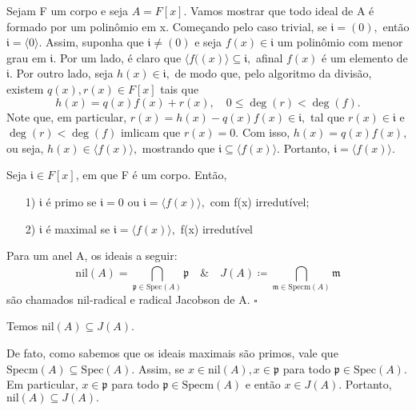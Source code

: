 \documentclass[AlgebraII/algebraII_notes.tex]{subfiles}
\begin{document}
\begin{example}
	Sejam F um corpo e seja \(A = F[x]\). Vamos mostrar que todo ideal de A é formado por um polinômio em x.
	Começando pelo caso trivial, se \(\mathfrak{i} = (0),\) então \(\mathfrak{i} = \langle 0 \rangle.\) Assim, suponha que \(\mathfrak{i}\neq (0)\)
	e seja \(f(x)\in \mathfrak{i}\) um polinômio com menor grau em \(\mathfrak{i}.\) Por um lado, é claro que \(\langle f((x) \rangle\subseteq \mathfrak{i},\)
	afinal \(f(x)\) é um elemento de \(\mathfrak{i}.\) Por outro lado, seja \(h(x)\in \mathfrak{i},\) de modo que, pelo algoritmo da divisão, existem \(q(x), r(x)\in F[x]\) tais que
	\[
		h(x) = q(x)f(x) + r(x),\quad 0\leq \deg{(r)}<\deg{(f)}.
	\]
	Note que, em particular, \(r(x) = h(x)-q(x)f(x)\in \mathfrak{i},\) tal que \(r(x)\in \mathfrak{i}\) e \(\deg{(r)} <\deg{(f)}\)
	imlicam que \(r(x) = 0\). Com isso, \(h(x) = q(x)f(x),\) ou seja, \(h(x)\in \langle f(x) \rangle,\) mostrando que \(\mathfrak{i}\subseteq \langle f(x) \rangle.\)
	Portanto, \(\mathfrak{i} = \langle f(x) \rangle.\)
\end{example}
\begin{lemma*}[Exercício]
	Seja \(\mathfrak{i}\in F[x]\), em que F é um corpo. Então,
	\begin{itemize}
		\item[1)] \(\mathfrak{i}\) é primo se \(\mathfrak{i} = 0\) ou \(\mathfrak{i} = \langle f(x) \rangle,\) com f(x) irredutível;
		\item[2)] \(\mathfrak{i}\) é maximal se \(\mathfrak{i} = \langle f(x) \rangle,\) f(x) irredutível
	\end{itemize}
\end{lemma*}
\begin{def*}
	Para um anel A, os ideais a seguir:
	\[
		\mathrm{nil}(A) = \bigcap_{\mathfrak{p}\in \mathrm{Spec}(A)}^{}{\mathfrak{p}}\quad \& \quad J(A)\coloneqq \bigcap_{\mathfrak{m}\in \mathrm{Specm}(A)}^{}{\mathfrak{m}}
	\]
	são chamados nil-radical e radical Jacobson de A. \(\square\)
\end{def*}
\begin{prop*}
	Temos \(\mathrm{nil}(A) \subseteq{J(A)}.\)
\end{prop*}
\begin{proof*}
	De fato, como sabemos que os ideais maximais são primos, vale que \(\mathrm{Specm}(A)\subseteq{\mathrm{Spec}(A)}.\) Assim, se
	\(x\in \mathrm{nil}(A),x\in \mathfrak{p}\) para todo \(\mathfrak{p}\in \mathrm{Spec}(A).\) Em particular, \(x\in \mathfrak{p}\) para todo \(\mathfrak{p}\in \mathrm{Specm}(A)\)
	e então \(x\in J(A)\). Portanto, \(\mathrm{nil}(A) \subseteq{J(A)}.\) \qedsymbol
\end{proof*}
\end{document}
